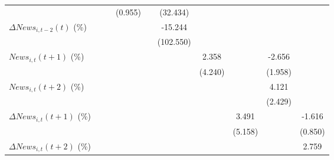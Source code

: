 {\begin{tabular}{l*{9}{c}}
                    &                     &                     &     (0.955)         &                     &    (32.434)         &                     &                     &                     &                     \\
\addlinespace
$ \Delta News_{i,t-2}(t)$ (\%)&                     &                     &                     &                     &     -15.244         &                     &                     &                     &                     \\
                    &                     &                     &                     &                     &   (102.550)         &                     &                     &                     &                     \\
\addlinespace
$ News_{i,t}(t+1)$ (\%)&                     &                     &                     &                     &                     &       2.358         &                     &      -2.656         &                     \\
                    &                     &                     &                     &                     &                     &     (4.240)         &                     &     (1.958)         &                     \\
\addlinespace
$ News_{i,t}(t+2)$ (\%)&                     &                     &                     &                     &                     &                     &                     &       4.121\sym{*}  &                     \\
                    &                     &                     &                     &                     &                     &                     &                     &     (2.429)         &                     \\
\addlinespace
$ \Delta News_{i,t}(t+1)$ (\%)&                     &                     &                     &                     &                     &                     &       3.491         &                     &      -1.616\sym{*}  \\
                    &                     &                     &                     &                     &                     &                     &     (5.158)         &                     &     (0.850)         \\
\addlinespace
$ \Delta News_{i,t}(t+2)$ (\%)&                     &                     &                     &                     &                     &                     &                     &                     &       2.759\sym{**} \\

\end{tabular}}
